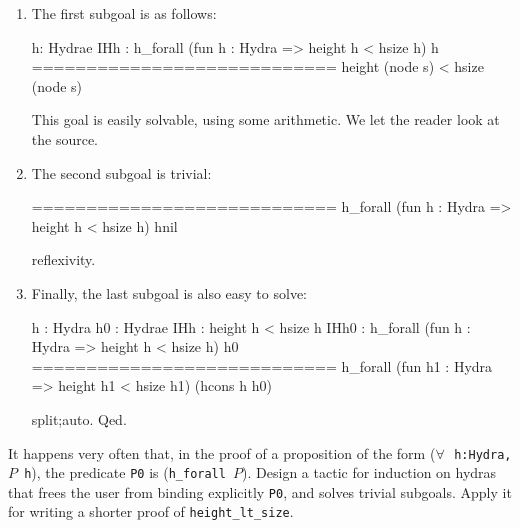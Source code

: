 \begin{enumerate}
\item The first subgoal is as follows:

\begin{Coqanswer}

  h: Hydrae
  IHh : h_forall (fun h : Hydra => height h < hsize h) h
  ============================
   height (node s) < hsize (node s) 

\end{Coqanswer}

This goal is easily solvable, using some arithmetic. We let the reader look at the source.

\item The second subgoal is trivial:

\begin{Coqanswer}

  ============================
    h_forall (fun h : Hydra => height h < hsize h) hnil

\end{Coqanswer}

\begin{Coqsrc}
  reflexivity.
\end{Coqsrc}

\item Finally, the last subgoal is also easy to solve:



\begin{Coqanswer}
  h : Hydra
  h0 : Hydrae
  IHh : height h < hsize h
  IHh0 : h_forall (fun h : Hydra => height h < hsize h) h0
  ============================
   h_forall (fun h1 : Hydra => height h1 < hsize h1) 
                 (hcons h h0)
\end{Coqanswer}  



\begin{Coqsrc}
 split;auto. 
Qed.   
\end{Coqsrc}

\end{enumerate}


\begin{exercise}
It happens very often that, in the proof of  a proposition of the form 
(\texttt{$\forall\,$ h:Hydra, $P$ h}), the predicate \texttt{P0}
is  (\texttt{h\_forall $P$}).  Design a tactic for induction on hydras that frees the user from binding explicitly \texttt{P0},  and solves trivial subgoals. Apply it for writing  a shorter proof of \texttt{height\_lt\_size}.
\end{exercise}
 


